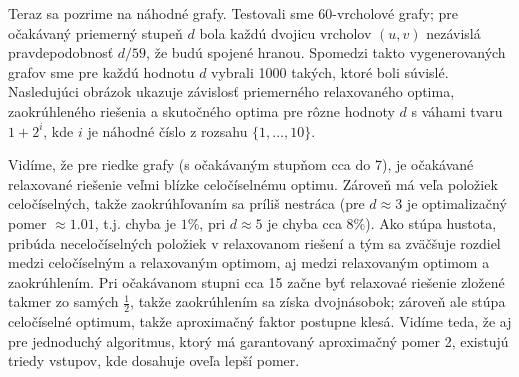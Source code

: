 \noindent
Teraz sa pozrime na náhodné grafy. Testovali sme 60-vrcholové grafy; pre očakávaný
priemerný stupeň $d$ bola každú dvojicu vrcholov $(u,v)$  nezávislá pravdepodobnosť $d/59$, že 
budú spojené hranou. Spomedzi takto vygenerovaných grafov sme pre každú hodnotu $d$ vybrali 1000 
takých, ktoré boli súvislé. Nasledujúci obrázok ukazuje závislosť priemerného relaxovaného optima,
zaokrúhleného riešenia a skutočného optima pre rôzne hodnoty $d$ s váhami tvaru $1+2^i$, kde $i$ 
je náhodné číslo z rozsahu $\{1,\ldots,10\}$.

\begin{center}
\end{center}

\noindent
Vidíme, že pre riedke grafy (s očakávaným stupňom cca do 7), je očakávané relaxované riešenie veľmi blízke
celočíselnému optimu. Zároveň má veľa položiek celočíselných, takže zaokrúhľovaním sa príliš nestráca
(pre $d\approx3$ je optimalizačný pomer $\approx1.01$, t.j. chyba je $1\%$, 
pri $d\approx5$ je chyba cca $8\%$). Ako stúpa hustota, pribúda neceločíselných položiek v relaxovanom riešení
a tým sa zväčšuje rozdiel medzi celočíselným a relaxovaným optimom, aj medzi relaxovaným optimom a 
zaokrúhlením. Pri očakávanom stupni cca 15 začne byť relaxovaé riešenie zložené takmer zo samých $\frac{1}{2}$,
takže zaokrúhlením sa získa dvojnásobok; zároveň ale stúpa celočíselné optimum, takže aproximačný faktor
postupne klesá. Vidíme teda, že aj pre jednoduchý algoritmus, ktorý má garantovaný aproximačný pomer 2, 
existujú triedy vstupov, kde dosahuje oveľa lepší pomer.

